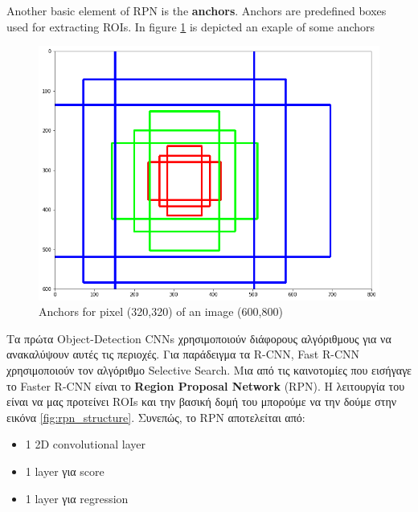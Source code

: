 Another basic element of RPN is the \textbf{anchors}. Anchors are predefined boxes used for extracting ROIs. In figure \ref{fig:anchors} is
depicted an exaple of some anchors
\begin{figure}[h]
  \centering
  \includegraphics[scale=0.3]{./figures/anchors}
  \caption{ Anchors for pixel (320,320) of an image (600,800) }
  \label{fig:anchors}
\end{figure}

\gr Τα πρώτα \en Object-Detection CNNs \gr χρησιμοποιούν διάφορους αλγόριθμους για να ανακαλύψουν αυτές τις περιοχές. Για παράδειγμα
τα \en R-CNN\cite{DBLP:journals/corr/GirshickDDM13}, Fast R-CNN\cite{Girshick:2015:FR:2919332.2920125} \gr χρησιμοποιούν τον αλγόριθμο
\en Selective Search. \gr Μια από τις καινοτομίες που εισήγαγε το \en Faster R-CNN \gr είναι το \en \textbf{Region Proposal Network} (RPN).
\gr H λειτουργία του είναι να μας προτείνει \en ROIs \gr και την βασική δομή του μπορούμε να την δούμε στην εικόνα \ref{fig:rpn_structure}.
\gr Συνεπώς, το \en RPN \gr αποτελείται από:
\begin{itemize}
\item 1 \en 2D convolutional layer
\item 1 \en layer \gr για \en score
\item 1 \en layer \gr για  \en regression
\end{itemize}

